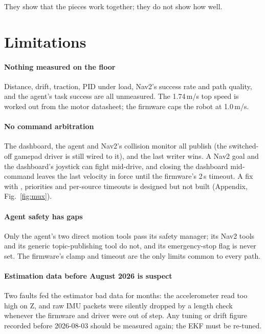 \documentclass[11pt]{article}
\begin{document}
They show that the pieces work together; they do not show how well.

\section{Limitations}
\label{sec:limits}

\paragraph{Nothing measured on the floor} Distance, drift, traction, PID under load, Nav2's success rate and path quality, and the agent's task success are all unmeasured. The 1.74\,m/s top speed is worked out from the motor datasheet; the firmware caps the robot at 1.0\,m/s.

\paragraph{No command arbitration} The dashboard, the agent and Nav2's collision monitor all publish  (the switched-off gamepad driver is still wired to it), and the last writer wins. A Nav2 goal and the dashboard's joystick can fight mid-drive, and closing the dashboard mid-command leaves the last velocity in force until the firmware's 2\,s timeout. A fix with , priorities and per-source timeouts is designed but not built (Appendix, Fig.~\ref{fig:mux}).

\paragraph{Agent safety has gaps} Only the agent's two direct motion tools pass its safety manager; its Nav2 tools and its generic topic-publishing tool do not, and its emergency-stop flag is never set. The firmware's clamp and timeout are the only limits common to every path.

\paragraph{Estimation data before August 2026 is suspect} Two faults fed the estimator bad data for months: the accelerometer read too high on Z, and raw IMU packets were silently dropped by a length check whenever the firmware and driver were out of step. Any tuning or drift figure recorded before 2026-08-03 should be measured again; the EKF must be re-tuned.
\end{document}
